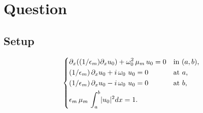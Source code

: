 \section{Question}
\subsection*{Setup}
\begin{equation}\label{eq:1}
\begin{dcases*}
\partial_x((1/\epsilon_m)\partial_x u_0) + \omega_{0}^2 \, \mu_m \, u_0 = 0 &
  in $(a,b)$,\\
(1/\epsilon_m) \, \partial_x u_0 + i \, \omega_0 \ u_0 = 0 &
  at $a$,\\
(1/\epsilon_m) \, \partial_x u_0 - i \, \omega_0 \ u_0 = 0 &
  at $b$,\\  
\epsilon_m \, \mu_m \, \int_{a}^{b} \lvert u_0 \rvert^2 dx = 1.
\end{dcases*}
\end{equation}\\
